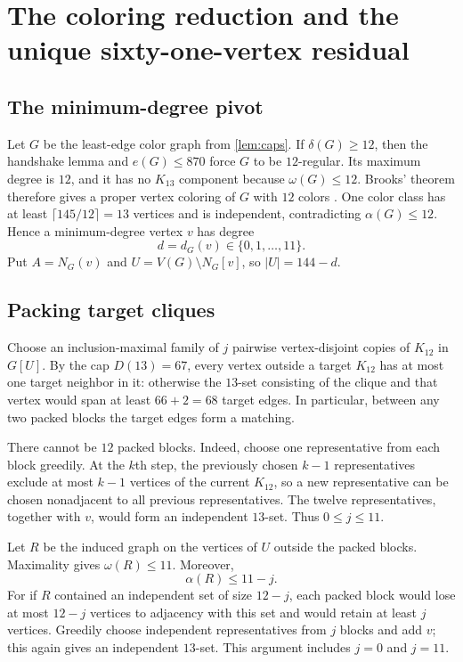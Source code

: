 \section{The coloring reduction and the unique sixty-one-vertex residual}
\label{sec:frontend}

\subsection{The minimum-degree pivot}

Let $G$ be the least-edge color graph from \cref{lem:caps}. If $\delta(G)\geq12$, then the handshake lemma and $e(G)\leq870$ force $G$ to be $12$-regular. Its maximum degree is $12$, and it has no $K_{13}$ component because $\omega(G)\leq12$. Brooks' theorem therefore gives a proper vertex coloring of $G$ with $12$ colors \cite{Brooks1941}. One color class has at least $\lceil145/12\rceil=13$ vertices and is independent, contradicting $\alpha(G)\leq12$. Hence a minimum-degree vertex $v$ has degree
\[
d=d_G(v)\in\{0,1,\ldots,11\}.
\]
Put $A=N_G(v)$ and $U=V(G)\setminus N_G[v]$, so $|U|=144-d$.

\subsection{Packing target cliques}

Choose an inclusion-maximal family of $j$ pairwise vertex-disjoint copies of $K_{12}$ in $G[U]$. By the cap $D(13)=67$, every vertex outside a target $K_{12}$ has at most one target neighbor in it: otherwise the $13$-set consisting of the clique and that vertex would span at least $66+2=68$ target edges. In particular, between any two packed blocks the target edges form a matching.

There cannot be $12$ packed blocks. Indeed, choose one representative from each block greedily. At the $k$th step, the previously chosen $k-1$ representatives exclude at most $k-1$ vertices of the current $K_{12}$, so a new representative can be chosen nonadjacent to all previous representatives. The twelve representatives, together with $v$, would form an independent $13$-set. Thus $0\leq j\leq11$.

Let $R$ be the induced graph on the vertices of $U$ outside the packed blocks. Maximality gives $\omega(R)\leq11$. Moreover,
\[
\alpha(R)\leq11-j.
\]
For if $R$ contained an independent set of size $12-j$, each packed block would lose at most $12-j$ vertices to adjacency with this set and would retain at least $j$ vertices. Greedily choose independent representatives from $j$ blocks and add $v$; this again gives an independent $13$-set. This argument includes $j=0$ and $j=11$.

